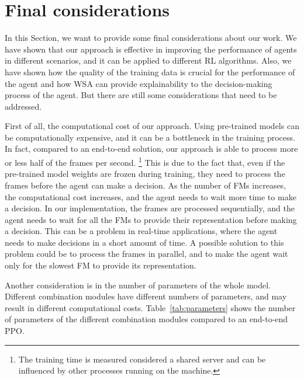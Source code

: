 \section{Final considerations}\label{sec:final-considerations}
In this Section, we want to provide some final considerations about our work.
We have shown that our approach is effective in improving the performance of agents in different scenarios, and it can be applied to different RL algorithms.
Also, we have shown how the quality of the training data is crucial for the performance of the agent and how WSA can provide explainability to the decision-making process of the agent.
But there are still some considerations that need to be addressed.

First of all, the computational cost of our approach.
Using pre-trained models can be computationally expensive, and it can be a bottleneck in the training process.
In fact, compared to an end-to-end solution, our approach is able to process more or less half of the frames per second. \footnote{The training time is measured considered a shared server and can be influenced by other processes running on the machine.}
This is due to the fact that, even if the pre-trained model weights are frozen during training, they need to process the frames before the agent can make a decision.
As the number of FMs increases, the computational cost increases, and the agent needs to wait more time to make a decision.
In our implementation, the frames are processed sequentially, and the agent needs to wait for all the FMs to provide their representation before making a decision.
This can be a problem in real-time applications, where the agent needs to make decisions in a short amount of time.
A possible solution to this problem could be to process the frames in parallel, and to make the agent wait only for the slowest FM to provide its representation.

Another consideration is in the number of parameters of the whole model.
Different combination modules have different numbers of parameters, and may result in different computational costs.
Table~\ref{tab:parameters} shows the number of parameters of the different combination modules compared to an end-to-end PPO.




